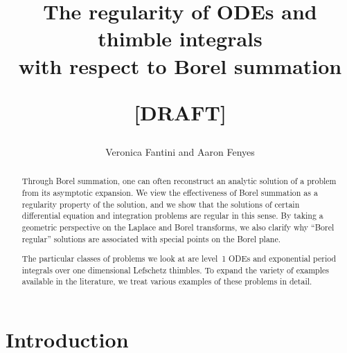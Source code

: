 \documentclass{article}
\title{The regularity of ODEs and thimble integrals \\
with respect to Borel summation \begin{draft}\textbf{[DRAFT]}\end{draft}}
\author{Veronica Fantini and Aaron Fenyes}
\theoremstyle{definition}
\theoremstyle{plain}
\begin{document}
\maketitle

\begin{abstract}
Through Borel summation, one can often reconstruct an analytic solution of a problem from its asymptotic expansion. We view the effectiveness of Borel summation as a regularity property of the solution, and we show that the solutions of certain differential equation and integration problems are regular in this sense. By taking a geometric perspective on the Laplace and Borel transforms, we also clarify why ``Borel regular'' solutions are associated with special points on the Borel plane.

The particular classes of problems we look at are level~1 ODEs and exponential period integrals over one dimensional Lefschetz thimbles. To expand the variety of examples available in the literature, we treat various examples of these problems in detail.
\end{abstract}
\tableofcontents
%
\section{Introduction}
%
\end{document}
